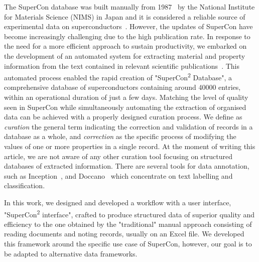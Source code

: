 \documentclass[]{interact}
\theoremstyle{plain} %
\theoremstyle{definition}
\theoremstyle{remark}
\begin{document}

The SuperCon database was built manually from 1987~\cite{ishii2023structuring} by the National Institute for Materials Science (NIMS) in Japan and it is considered a reliable source of experimental data on superconductors~\cite{roter2020predicting, stanev_machine_2017, tran2022machine, konno2021deep}. 
However, the updates of SuperCon have become increasingly challenging due to the high publication rate. 
In response to the need for a more efficient approach to sustain productivity, we embarked on the development of an automated system for extracting material and property information from the text contained in relevant scientific publications~\cite{lfoppiano2023automatic}. 
This automated process enabled the rapid creation of "SuperCon\textsuperscript{2} Database", a comprehensive database of superconductors containing around 40000 entries, within an operational duration of just a few days. 
Matching the level of quality seen in SuperCon while simultaneously automating the extraction of organised data can be achieved with a properly designed curation process. 
We define as \emph{curation} the general term indicating the correction and validation of records in a database as a whole, and \emph{correction} as the specific process of modifying the values of one or more properties in a single record. 
At the moment of writing this article, we are not aware of any other curation tool focusing on structured databases of extracted information. 
There are several tools for data annotation, such as Inception~\cite{klie-etal-2018-inception}, and Doccano~\cite{doccano} which concentrate on text labelling and classification.

In this work, we designed and developed a workflow with a user interface, "SuperCon\textsuperscript{2} interface", crafted to produce structured data of superior quality and efficiency to the one obtained by the "traditional" manual approach consisting of reading documents and noting records, usually on an Excel file.
We developed this framework around the specific use case of SuperCon, however, our goal is to be adapted to alternative data frameworks.
\end{document}
